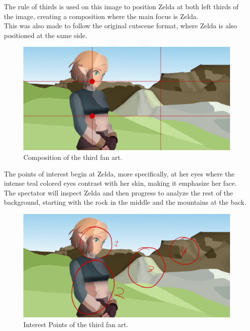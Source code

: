 \documentclass{cup-pan}
\begin{document}
            The rule of thirds is used on this image to position Zelda at both left thirds of the image, creating a composition where the main focus is Zelda.\\
            This was also made to follow the original cutscene format, where Zelda is also positioned at the same side. 
            \begin{figure}[H]
                \includegraphics[width=\textwidth]{Fanart3/0_Analisi/tercios.png}
                \caption{Composition of the third fan art.}
            \end{figure}

            The points of interest begin at Zelda, more specifically, at her eyes where the intense teal colored eyes contrast with her skin, making it emphasize her face.\\
            The spectator will inspect Zelda and then progress to analyze the rest of the background, starting with the rock in the middle and the mountains at the back. \\
            \begin{figure}[H]
                \includegraphics[width=\textwidth]{Fanart3/0_Analisi/puntosinteres.png}
                \caption{Interest Points of the third fan art.}
            \end{figure}
\end{document}
